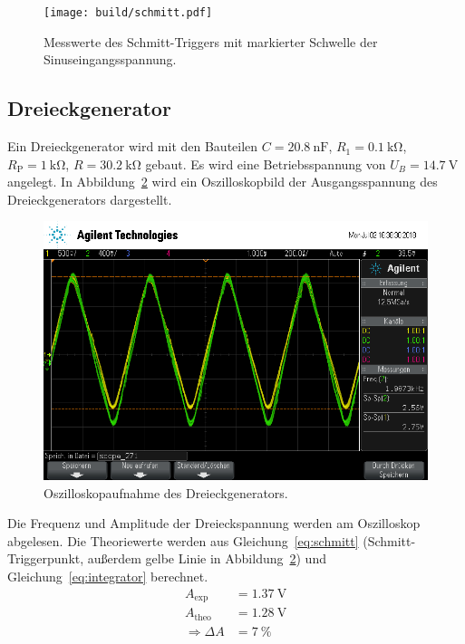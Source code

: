 \begin{figure}[ht]
  \centering
    \centering
    \texttt{[image: build/schmitt.pdf]}
    \caption{Messwerte des Schmitt-Triggers mit markierter Schwelle der Sinuseingangsspannung.}
    \label{fig:schmitt_plot}
  \label{fig:schmitt}
\end{figure}

\subsection{Dreieckgenerator}
Ein Dreieckgenerator wird mit den Bauteilen
$C = \SI{20.8}{\nano\farad}$,
$R_1 = \SI{0.1}{\kilo\ohm}$,
$R_\text{P} = \SI{1}{\kilo\ohm}$,
$R = \SI{30.2}{\kilo\ohm}$
gebaut.
Es wird eine Betriebsspannung von $U_B = \SI{14.7}{\volt}$ angelegt.
In Abbildung~\ref{fig:dreieck_generator} wird ein Oszilloskopbild
der Ausgangsspannung des Dreieckgenerators dargestellt.
\begin{figure}[ht]
  \centering
  \includegraphics[height=0.3\textheight]{data/scope_271.png}
  \caption{Oszilloskopaufnahme des Dreieckgenerators.}
  \label{fig:dreieck_generator}
\end{figure}

Die Frequenz und Amplitude der Dreieckspannung werden am Oszilloskop abgelesen.
Die Theoriewerte werden aus Gleichung~\eqref{eq:schmitt} (Schmitt-Triggerpunkt, außerdem gelbe Linie in Abbildung~\ref{fig:dreieck_generator})
und Gleichung~\eqref{eq:integrator} berechnet.
\begin{align*}
  A_\text{exp} &= \SI{1.37}{\volt} \\
  A_\text{theo} &= \SI{1.28}{\volt} \\
  \Rightarrow \Delta A &= \SI{7}{\percent}
\end{align*}

